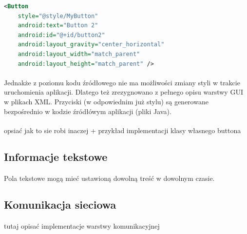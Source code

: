 \begin{lstlisting}[language=XML]
<Button
    style="@style/MyButton"
    android:text="Button 2"
    android:id="@+id/button2"
    android:layout_gravity="center_horizontal"
    android:layout_width="match_parent"
    android:layout_height="match_parent" />
\end{lstlisting}

\paragraph{}
Jednakże z poziomu kodu źródłowego nie ma możliwości zmiany styli w trakcie uruchomienia aplikacji.  Dlatego też zrezygnowano z pełnego opisu warstwy GUI w plikach XML. Przyciski (w odpowiednim już stylu) są generowane bezpośrednio w kodzie źródłówym aplikacji (pliki Java). 
\paragraph{}
{\color{red}opsiać jak to sie robi inaczej + przykład implementacji klasy własnego buttona}

\subsection{Informacje tekstowe}
\paragraph{}
Pola tekstowe mogą mieć ustawioną dowolną treść w dowolnym czasie.

\subsection{Komunikacja sieciowa}
\paragraph{}
{\color{red}tutaj opisać implementacje warstwy komunikacyjnej}
